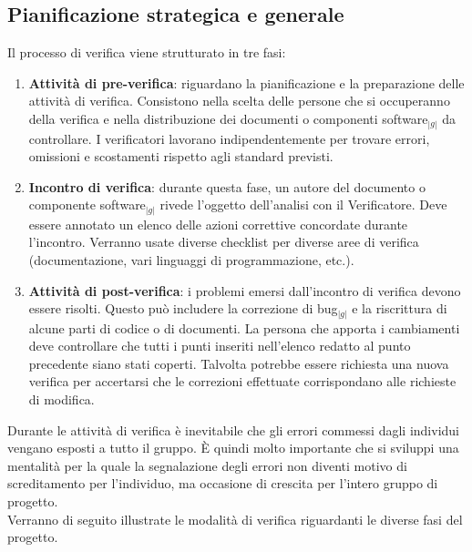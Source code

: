 {{		\subsection{Pianificazione strategica e generale}{
		\label{commint}
		Il processo di verifica viene strutturato in tre fasi:
		\begin{enumerate}
		    \item \textbf{Attività di pre-verifica}: riguardano la pianificazione e la preparazione delle attività di verifica. 
			  Consistono nella scelta delle persone che si occuperanno della verifica e nella distribuzione dei documenti o componenti 
			  software$_{|g|}$ da controllare. I verificatori lavorano indipendentemente per trovare errori, omissioni e scostamenti 
			  rispetto agli standard previsti.
		    \item \textbf{Incontro di verifica}: durante questa fase, un autore del documento o componente software$_{|g|}$ rivede 
			  l’oggetto dell’analisi con il Verificatore. Deve essere annotato un elenco delle azioni correttive concordate 
			  durante l’incontro. Verranno usate diverse checklist per diverse aree di verifica 
			  (documentazione, vari linguaggi di programmazione, etc.).
		    \item \textbf{Attività di post-verifica}: i problemi emersi dall’incontro di verifica devono essere risolti. Questo può 
			  includere la correzione di bug$_{|g|}$ e la riscrittura di alcune parti di codice o di documenti. La persona che apporta 
			  i cambiamenti deve controllare che tutti i punti inseriti nell’elenco redatto al punto precedente siano stati coperti. 
			  Talvolta potrebbe essere richiesta una nuova verifica per accertarsi che le correzioni effettuate 
			  corrispondano alle richieste di modifica.
		\end{enumerate}

		Durante le attività di verifica è inevitabile che gli errori commessi dagli individui vengano esposti a tutto il gruppo. 
		\`E quindi molto importante che si sviluppi una mentalità per la quale la segnalazione degli errori non diventi motivo di 
		screditamento per l’individuo, ma occasione di crescita per l’intero gruppo di progetto.\\
		Verranno di seguito illustrate le modalità di verifica riguardanti le diverse fasi del progetto.
	}

}}
